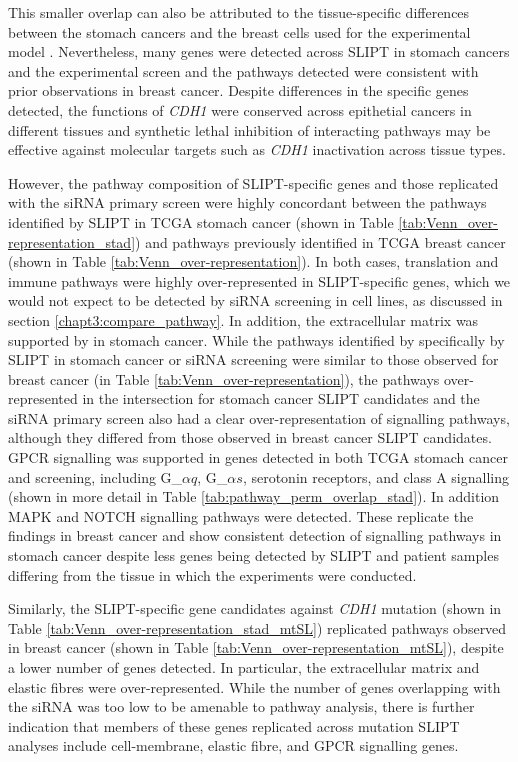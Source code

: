 This smaller overlap can also be attributed to the tissue-specific differences between the stomach cancers and the breast cells used for the experimental model \citep{Chen2014}. Nevertheless, many genes were detected across SLIPT in stomach cancers and the experimental screen \citep{Telford2015} and the pathways detected were consistent with prior observations in breast cancer. Despite differences in the specific genes detected, the functions of \textit{CDH1} were conserved across epithetial cancers in different tissues and synthetic lethal inhibition of interacting pathways may be effective against molecular targets such as \textit{CDH1} inactivation across tissue types.

However, the pathway composition of SLIPT-specific genes and those replicated with the siRNA primary screen \citep{Telford2015} were highly concordant between the pathways identified by SLIPT in TCGA stomach cancer (shown in Table \ref{tab:Venn_over-representation_stad}) and pathways previously identified in TCGA breast cancer (shown in Table \ref{tab:Venn_over-representation}). In both cases, translation and immune pathways were highly over-represented in SLIPT-specific genes, which we would not expect to be detected by siRNA screening in cell lines, as discussed in section \ref{chapt3:compare_pathway}. In addition, the extracellular matrix was supported by in stomach cancer. While the pathways identified by specifically by SLIPT in stomach cancer or siRNA screening were similar to those observed for breast cancer (in Table \ref{tab:Venn_over-representation}), the pathways over-represented in the intersection for stomach cancer SLIPT candidates and the siRNA primary screen \citep{Telford2015} also had a clear over-representation of signalling pathways, although they differed from those observed in breast cancer SLIPT candidates. GPCR signalling was supported in genes detected in both TCGA stomach cancer and screening, including G_${\alpha q}$, G_${\alpha s}$, serotonin receptors, and class A signalling (shown in more detail in Table \ref{tab:pathway_perm_overlap_stad}). In addition MAPK and NOTCH signalling pathways were detected. These replicate the findings in breast cancer and show consistent detection of signalling pathways in stomach cancer despite less genes being detected by SLIPT and patient samples differing from the tissue in which the experiments were conducted.

Similarly, the SLIPT-specific gene candidates against \textit{CDH1} mutation (shown in Table \ref{tab:Venn_over-representation_stad_mtSL}) replicated pathways observed in breast cancer (shown in Table \ref{tab:Venn_over-representation_mtSL}), despite a lower number of genes detected. In particular, the extracellular matrix and elastic fibres were over-represented. While the number of genes overlapping with the siRNA was too low to be amenable to pathway analysis, there is further indication that members of these genes replicated across mutation SLIPT analyses include cell-membrane, elastic fibre, and GPCR signalling genes. 

